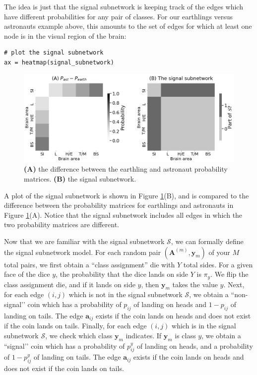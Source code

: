 The idea is just that the signal subnetwork is keeping track of the edges which have different probabilities for any pair of classes. For our earthlings versus astronauts example above, this amounts to the set of edges for which at least one node is in the visual region of the brain:

\begin{lstlisting}[style=python]
# plot the signal subnetwork
ax = heatmap(signal_subnetwork)
\end{lstlisting}

\begin{figure}
    \centering
    \includegraphics[width=\linewidth]{representations/ch5/Images/ssg_ssn.png}
    \caption[Signal subnetwork for earthling and astronaut examples]{\textbf{(A)} the difference between the earthling and astronaut probability matrices. \textbf{(B)} the signal subnetwork.}
    \label{fig:ch5:ssg_ssn}
\end{figure}

A plot of the signal subnetwork is shown in Figure \ref{fig:ch5:ssg_ssn}(B), and is compared to the difference between the probability matrices for earthlings and astronauts in Figure \ref{fig:ch5:ssg_ssn}(A). Notice that the signal subnetwork includes all edges in which the two probability matrices are different. 

Now that we are familiar with the signal subnetwork $\mathcal S$, we can formally define the signal subnetwork model. For each random pair $(\mathbf A^{(m)}, \mathbf y_m)$ of your $M$ total pairs, we first obtain a ``class assignment'' die with $Y$ total sides. For a given face of the dice $y$, the probability that the dice lands on side $Y$ is $\pi_y$. We flip the class assignment die, and if it lands on side $y$, then $\mathbf y_m$ takes the value $y$. Next, for each edge $(i,j)$ which is not in the signal subnetwork $\mathcal S$, we obtain a ``non-signal’’ coin which has a probability of $p_{ij}$ of landing on heads and $1 - p_{ij}$ of landing on tails. The edge $\mathbf a_{ij}$ exists if the coin lands on heads and does not exist if the coin lands on tails. Finally, for each edge $(i, j)$ which is in the signal subnetwork $\mathcal S$, we check which class $\mathbf y_m$ indicates. If $\mathbf y_m$ is class $y$, we obtain a ``signal’’ coin which has a probability of $p_{ij}^y$ of landing on heads, and a probability of $1 - p_{ij}^y$ of landing on tails. The edge $\mathbf a_{ij}$ exists if the coin lands on heads and does not exist if the coin lands on tails. 

